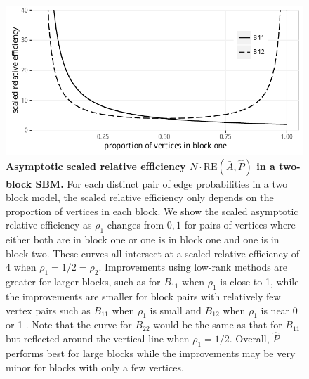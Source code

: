\documentclass[10pt,letterpaper]{article}
\renewcommand{\hat}{\widehat}
\begin{document}



\begin{figure}[!t]
\centering
\includegraphics[width=1\textwidth]{Rho.pdf}
\caption{{\bf Asymptotic scaled relative efficiency $N\cdot \mathrm{RE}(\bar{A},\hat{P})$ in a two-block SBM.}
For each distinct pair of edge probabilities in a two block model, the scaled relative efficiency only depends on the proportion of vertices in each block.
We show the scaled asymptotic relative efficiency as $\rho_1$ changes from $0,1$ for pairs of vertices where either both are in block one or one is in block one and one is in block two. 
These curves all intersect at a scaled relative efficiency of 4 when $\rho_1=1/2=\rho_2$.
Improvements using low-rank methods are greater for larger blocks, such as for $B_{11}$ when $\rho_1$ is close to 1, while the improvements are smaller for block pairs with relatively few vertex pairs such as $B_{11}$ when $\rho_1$ is small and $B_{12}$ when $\rho_1$ is near 0 or 1
.
Note that the curve for $B_{22}$ would be the same as that for $B_{11}$ but reflected around the vertical line when $\rho_1=1/2$.
Overall, $\hat{P}$ performs best for large blocks while the improvements may be very minor for blocks with only a few vertices.
}
\label{fig:RErho}
\end{figure}
\end{document}
